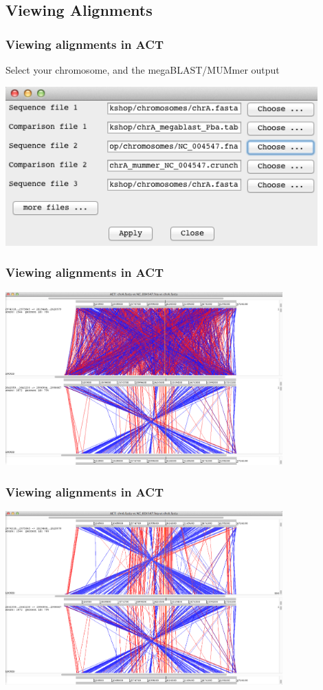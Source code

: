 \documentclass[table]{beamer}
\begin{document}
  \subsection{Viewing Alignments}
    \begin{frame}
      \frametitle{Viewing alignments in ACT}    
      Select your chromosome, and the megaBLAST/MUMmer output
      \begin{center}
        \includegraphics[width=0.9\textwidth]{images/act_wgs8}     
      \end{center}
    \end{frame}

    \begin{frame}
      \frametitle{Viewing alignments in ACT}    
      \begin{center}
        \includegraphics[width=0.8\textwidth]{images/act_wgs9}     
      \end{center}
    \end{frame}

    \begin{frame}
      \frametitle{Viewing alignments in ACT}    
      \begin{center}
        \includegraphics[width=0.8\textwidth]{images/act_wgs10}     
      \end{center}
    \end{frame}
\end{document}
